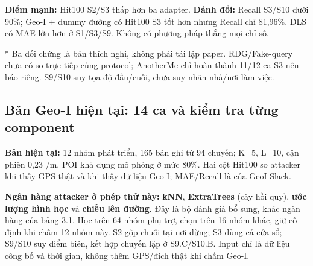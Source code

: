 \textbf{Điểm mạnh:} Hit100 S2/S3 thấp hơn ba adapter. \textbf{Đánh đổi:} Recall S3/S10 dưới 90\%; Geo-I + dummy đường có Hit100 S3 tốt hơn nhưng Recall chỉ 81,96\%. DLS có MAE lớn hơn ở S1/S3/S9. Không có phương pháp thắng mọi chỉ số.

* Ba đối chứng là bản thích nghi, không phải tái lập paper. RDG/Fake-query chưa có so trực tiếp cùng protocol; AnotherMe chỉ hoàn thành 11/12 ca S3 nên báo riêng. S9/S10 suy tọa độ đầu/cuối, chưa suy nhãn nhà/nơi làm việc.


\clearpage
\subsection{Bản Geo-I hiện tại: 14 ca và kiểm tra từng component}
\textbf{Bản hiện tại:} 12 nhóm phát triển, 165 bản ghi từ 94 chuyến; K=5, L=10, cận phiên 0,23 /m. POI khả dụng mô phỏng ở mức 80\%. Hai cột Hit100 so attacker khi thấy GPS thật và khi thấy dữ liệu Geo-I; MAE/Recall là của GeoI-Slack.

\textbf{Ngân hàng attacker ở phép thử này:} \textbf{kNN}, \textbf{ExtraTrees} (cây hồi quy), \textbf{ước lượng hình học} và \textbf{chiếu lên đường}. Đây là bộ đánh giá bổ sung, khác ngân hàng của bảng 3.1. Học trên 64 nhóm phụ trợ, chọn trên 16 nhóm khác, giữ cố định khi chấm 12 nhóm này. S2 gộp chuỗi tại nơi dừng; S3 dùng cả cửa sổ; S9/S10 suy điểm biên, kết hợp chuyến lặp ở S9.C/S10.B. Input chỉ là dữ liệu công bố và thời gian, không thêm GPS/đích thật khi chấm Geo-I.

